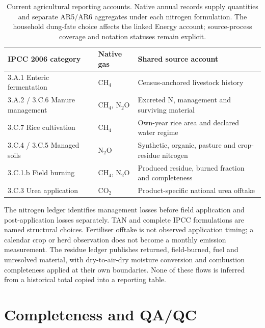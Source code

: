 \begin{table}[!htbp]
\centering\footnotesize
\begin{tabular}{@{}p{.23\linewidth}lp{.49\linewidth}@{}}
\toprule
IPCC 2006 category & Native gas & Shared source account\\\midrule
3.A.1 Enteric fermentation & CH$_4$ & Census-anchored livestock history\\
3.A.2 / 3.C.6 Manure management & CH$_4$, N$_2$O & Excreted N, management and surviving material\\
3.C.7 Rice cultivation & CH$_4$ & Own-year rice area and declared water regime\\
3.C.4 / 3.C.5 Managed soils & N$_2$O & Synthetic, organic, pasture and crop-residue nitrogen\\
3.C.1.b Field burning & CH$_4$, N$_2$O & Produced residue, burned fraction and completeness\\
3.C.3 Urea application & CO$_2$ & Product-specific national urea offtake\\\bottomrule
\end{tabular}
\caption{Current agricultural reporting accounts. Native annual records supply
quantities and separate AR5/AR6 aggregates under each nitrogen formulation.
The household dung-fate choice affects the linked Energy account; source-process
coverage and notation statuses remain explicit.}\label{tab:crt}
\end{table}

The nitrogen ledger identifies management losses before field application and
post-application losses separately. TAN and complete IPCC formulations are named
structural choices. Fertiliser offtake is not observed application timing; a
calendar crop or herd observation does not become a monthly emission measurement.
The residue ledger publishes returned, field-burned, fuel and unresolved
material, with dry-to-air-dry moisture conversion and combustion completeness
applied at their own boundaries. None of these flows is inferred from a
historical total copied into a reporting table.

\section{Completeness and QA/QC}
\label{app:completeness}

